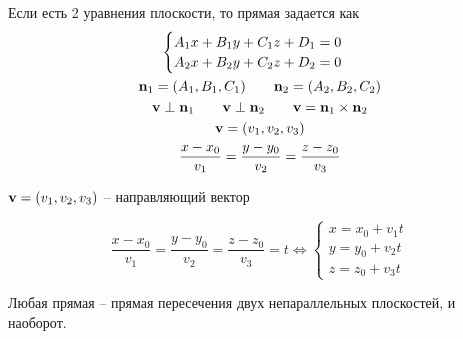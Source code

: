 \begin{definition}
    Если есть 2 уравнения плоскости, то прямая задается как
    \begin{gather*}
        \begin{cases}
            A_1 x + B_1 y + C_1 z + D_1 = 0 \\
            A_2 x + B_2 y + C_2 z + D_2 = 0
        \end{cases}\\
        \mathbf{n}_1 = (A_1, B_1, C_1) \qquad \mathbf{n}_2 = (A_2, B_2, C_2)\\
        \mathbf{v} \perp \mathbf{n}_1 \qquad \mathbf{v} \perp \mathbf{n}_2 \qquad \mathbf{v} = \mathbf{n}_1 \times \mathbf{n}_2\\
        \mathbf{v} = (v_1, v_2, v_3)\\
        \frac{x-x_0}{v_1} = \frac{y-y_0}{v_2} = \frac{z-z_0}{v_3}
    \end{gather*}
\end{definition}

\begin{definition}
    $\mathbf{v} = (v_1, v_2, v_3)$ -- направляющий вектор
\end{definition}

\begin{definition}
    \[
        \frac{x-x_0}{v_1} = \frac{y-y_0}{v_2} = \frac{z-z_0}{v_3} = t \Leftrightarrow
        \begin{cases}
            x = x_0 + v_1 t \\
            y = y_0 + v_2 t \\
            z = z_0 + v_3 t
        \end{cases}
    \]
\end{definition}

\begin{theorem}
    Любая прямая -- прямая пересечения двух непараллельных плоскостей, и наоборот.
\end{theorem}

